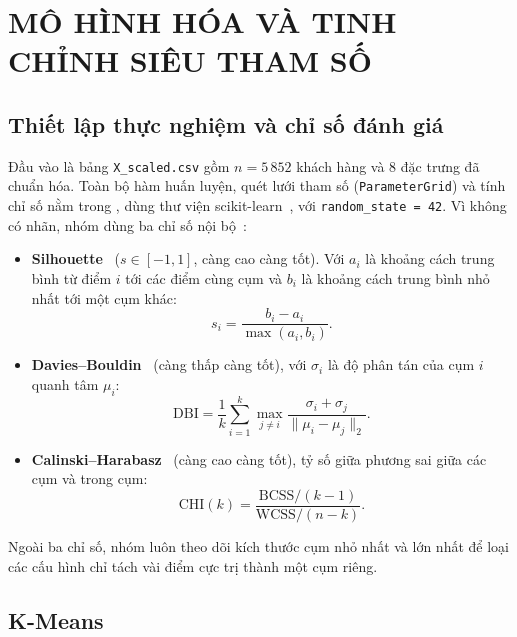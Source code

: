 \documentclass[../report.tex]{subfiles}
\begin{document}
\newpage
\section{MÔ HÌNH HÓA VÀ TINH CHỈNH SIÊU THAM SỐ}
\label{sec:model}

\subsection{Thiết lập thực nghiệm và chỉ số đánh giá}

Đầu vào là bảng \texttt{X\_scaled.csv} gồm $n = 5\,852$ khách hàng và 8 đặc trưng đã chuẩn hóa. Toàn bộ hàm huấn luyện, quét lưới tham số (\texttt{ParameterGrid}) và tính chỉ số nằm trong , dùng thư viện scikit-learn~\cite{pedregosa2011}, với \texttt{random\_state = 42}. Vì không có nhãn, nhóm dùng ba chỉ số nội bộ~\cite{han2022}:

\begin{itemize}[leftmargin=1.5em]
\item \textbf{Silhouette}~\cite{rousseeuw1987} ($s \in [-1,1]$, càng cao càng tốt). Với $a_i$ là khoảng cách trung bình từ điểm $i$ tới các điểm cùng cụm và $b_i$ là khoảng cách trung bình nhỏ nhất tới một cụm khác:
\begin{equation}
s_i = \frac{b_i - a_i}{\max(a_i, b_i)}.
\end{equation}
\item \textbf{Davies--Bouldin}~\cite{davies1979} (càng thấp càng tốt), với $\sigma_i$ là độ phân tán của cụm $i$ quanh tâm $\mu_i$:
\begin{equation}
\mathrm{DBI} = \frac{1}{k}\sum_{i=1}^{k} \max_{j \ne i} \frac{\sigma_i + \sigma_j}{\lVert \mu_i - \mu_j \rVert_2}.
\end{equation}
\item \textbf{Calinski--Harabasz}~\cite{calinski1974} (càng cao càng tốt), tỷ số giữa phương sai giữa các cụm và trong cụm:
\begin{equation}
\mathrm{CHI}(k) = \frac{\mathrm{BCSS}/(k-1)}{\mathrm{WCSS}/(n-k)}.
\end{equation}
\end{itemize}
Ngoài ba chỉ số, nhóm luôn theo dõi kích thước cụm nhỏ nhất và lớn nhất để loại các cấu hình chỉ tách vài điểm cực trị thành một cụm riêng.

\subsection{K-Means}
\end{document}
